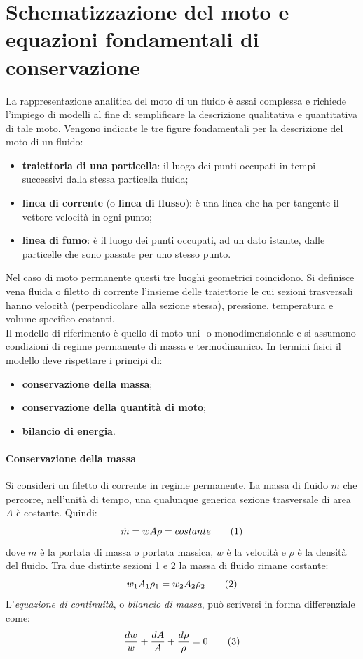 \section[Moto e equazioni fondamentali]{Schematizzazione del moto e equazioni fondamentali di conservazione}
La rappresentazione analitica del moto di un fluido è assai complessa e richiede l'impiego di modelli al fine di semplificare la descrizione qualitativa e quantitativa di tale moto. Vengono indicate le tre figure fondamentali per la descrizione del moto di un fluido:
\begin{itemize}
\item \textbf{traiettoria di una particella}: il luogo dei punti occupati in tempi successivi dalla stessa particella fluida;
\item \textbf{linea di corrente} (o \textbf{linea di flusso}): è una linea che ha per tangente il vettore velocità in ogni punto;
\item \textbf{linea di fumo}: è il luogo dei punti occupati, ad un dato istante, dalle particelle che sono passate per uno stesso punto.
\end{itemize}
Nel caso di moto permanente questi  tre luoghi geometrici coincidono. Si definisce vena fluida o filetto di corrente l'insieme delle traiettorie le cui sezioni trasversali hanno velocità (perpendicolare alla sezione stessa), pressione, temperatura e volume specifico costanti.\\
Il modello di riferimento è quello di moto uni- o monodimensionale e si assumono condizioni di regime permanente di massa e termodinamico. In termini fisici il modello deve rispettare i principi di:
\begin{itemize}
\item \textbf{conservazione della massa};
\item \textbf{conservazione della quantità di moto};
\item \textbf{bilancio di energia}.
\end{itemize}

\paragraph{Conservazione della massa}
Si consideri un filetto di corrente in regime permanente. La massa di fluido $m$ che percorre, nell'unità di tempo, una qualunque generica sezione trasversale di area $A$ è costante. Quindi:
\[\dot{m}=wA\rho = costante\addtag\]
dove $\dot{m}$ è la portata di massa o portata massica, $w$ è la velocità e $\rho$ è la densità del fluido. Tra due distinte sezioni 1 e 2 la massa di fluido rimane costante:
\[w_1 A_1 \rho_1 = w_2 A_2 \rho_2\addtag\]
L'\textit{equazione di continuità}, o \textit{bilancio di massa}, può scriversi in forma differenziale come:
\[\frac{dw}{w} + \frac{dA}{A} + \frac{d\rho}{\rho} = 0\addtag\]


